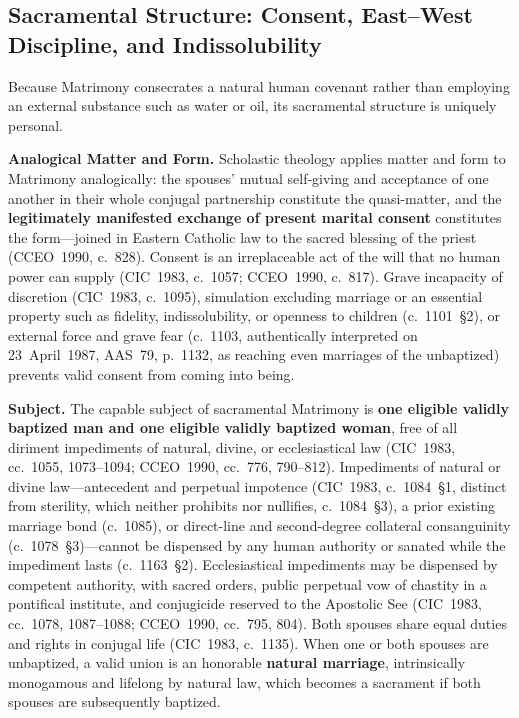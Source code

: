 \subsection{Sacramental Structure: Consent, East--West Discipline, and Indissolubility}
\label{subsec:matrimony-structure}

Because Matrimony consecrates a natural human covenant rather than employing an external substance such as water or oil, its sacramental structure is uniquely personal.

\textbf{Analogical Matter and Form.} Scholastic theology applies matter and form to Matrimony analogically: the spouses' mutual self-giving and acceptance of one another in their whole conjugal partnership constitute the quasi-matter, and the \textbf{legitimately manifested exchange of present marital consent} constitutes the form---joined in Eastern Catholic law to the sacred blessing of the priest (CCEO~1990, c.~828). Consent is an irreplaceable act of the will that no human power can supply (CIC~1983, c.~1057; CCEO~1990, c.~817). Grave incapacity of discretion (CIC~1983, c.~1095), simulation excluding marriage or an essential property such as fidelity, indissolubility, or openness to children (c.~1101~\S2), or external force and grave fear (c.~1103, authentically interpreted on 23~April~1987, AAS~79, p.~1132, as reaching even marriages of the unbaptized) prevents valid consent from coming into being.

\textbf{Subject.} The capable subject of sacramental Matrimony is \textbf{one eligible validly baptized man and one eligible validly baptized woman}, free of all diriment impediments of natural, divine, or ecclesiastical law (CIC~1983, cc.~1055, 1073--1094; CCEO~1990, cc.~776, 790--812). Impediments of natural or divine law---antecedent and perpetual impotence (CIC~1983, c.~1084~\S1, distinct from sterility, which neither prohibits nor nullifies, c.~1084~\S3), a prior existing marriage bond (c.~1085), or direct-line and second-degree collateral consanguinity (c.~1078~\S3)---cannot be dispensed by any human authority or sanated while the impediment lasts (c.~1163~\S2). Ecclesiastical impediments may be dispensed by competent authority, with sacred orders, public perpetual vow of chastity in a pontifical institute, and conjugicide reserved to the Apostolic See (CIC~1983, cc.~1078, 1087--1088; CCEO~1990, cc.~795, 804). Both spouses share equal duties and rights in conjugal life (CIC~1983, c.~1135). When one or both spouses are unbaptized, a valid union is an honorable \textbf{natural marriage}, intrinsically monogamous and lifelong by natural law, which becomes a sacrament  if both spouses are subsequently baptized.

